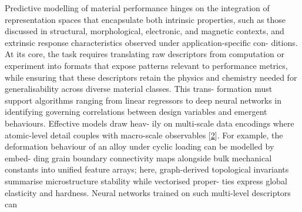 \documentclass[
]{article}
\begin{document}
Predictive modelling of material performance hinges on the integration
of representation spaces that encapsulate both intrinsic properties,
such as those discussed in structural, morphological, electronic, and
magnetic contexts, and extrinsic response characteristics observed under
application-specific con- ditions. At its core, the task requires
translating raw descriptors from computation or experiment into formats
that expose patterns relevant to performance metrics, while ensuring
that these descriptors retain the physics and chemistry needed for
generalisability across diverse material classes. This trans- formation
must support algorithms ranging from linear regressors to deep neural
networks in identifying governing correlations between design variables
and emergent behaviours. Effective models draw heav- ily on multi-scale
data encodings where atomic-level detail couples with macro-scale
observables {[}\protect\hyperlink{_bookmark42}{2}{]}. For example, the
deformation behaviour of an alloy under cyclic loading can be modelled
by embed- ding grain boundary connectivity maps alongside bulk
mechanical constants into unified feature arrays; here, graph-derived
topological invariants summarise microstructure stability while
vectorised proper- ties express global elasticity and hardness. Neural
networks trained on such multi-level descriptors can
\end{document}
